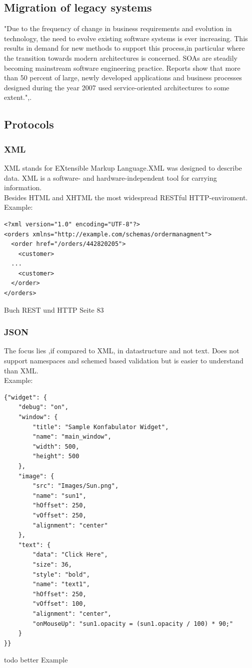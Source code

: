 \documentclass[12pt]{article}
\begin{document}
\subsection{Migration of legacy systems}
"Due to the frequency of change in business requirements and evolution in technology, the need
to evolve existing software systems is ever increasing. This results in demand for new methods
to support this process,in particular where the transition towards modern architectures is concerned.
SOAs are steadily becoming mainstream software engineering practice. Reports show that
more than 50 percent of large, newly developed applications and business processes designed during
the year 2007 used service-oriented architectures to some extent.",\cite{legacy}.
\\
\subsection{Protocols}
\subsubsection{XML}
XML stands for EXtensible Markup Language.XML was designed to describe data.
XML is a software- and hardware-independent tool for carrying information.\\
Besides HTML and XHTML the most widespread RESTful HTTP-enviroment.\\
Example:\\
\begin{lstlisting}
<?xml version="1.0" encoding="UTF-8"?>
<orders xmlns="http://example.com/schemas/ordermanagment">
  <order href="/orders/442820205">
    <customer>
  ...
    <customer>
  </order>
</orders>
\end{lstlisting}
Buch REST und HTTP Seite 83
\subsubsection{JSON}
The focus lies ,if compared to XML, in datastructure and not text.
Does not support namespaces and schemed based validation but is easier to understand
than XML.\\
Example:\\
\begin{lstlisting}
{"widget": {
    "debug": "on",
    "window": {
        "title": "Sample Konfabulator Widget",
        "name": "main_window",
        "width": 500,
        "height": 500
    },
    "image": { 
        "src": "Images/Sun.png",
        "name": "sun1",
        "hOffset": 250,
        "vOffset": 250,
        "alignment": "center"
    },
    "text": {
        "data": "Click Here",
        "size": 36,
        "style": "bold",
        "name": "text1",
        "hOffset": 250,
        "vOffset": 100,
        "alignment": "center",
        "onMouseUp": "sun1.opacity = (sun1.opacity / 100) * 90;"
    }
}}
\end{lstlisting}
todo{ better Example}
\end{document}
